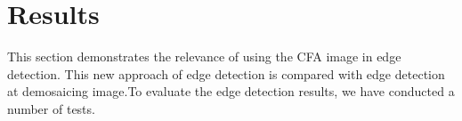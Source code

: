 \documentclass[twoside]{article}
\begin{document}
%	
%	
%			
%			
%		
%


	
\section{Results}
\label{sec:Results}
This section demonstrates the relevance of using the CFA image in edge detection. This new approach of edge detection is compared with edge detection at demosaicing image.To evaluate the edge detection results, we have conducted a number of tests.   
\end{document}
